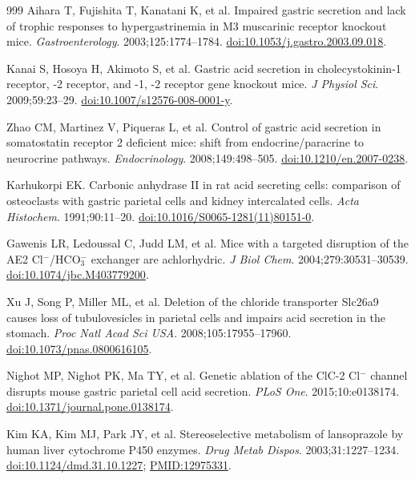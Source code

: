 \documentclass[11pt,a4paper,notitlepage]{report}
\begin{document}
\begin{thebibliography}{999}
 Aihara T, Fujishita T, Kanatani K, et al. Impaired gastric secretion and lack of trophic responses to hypergastrinemia in M3 muscarinic receptor knockout mice. \textit{Gastroenterology}. 2003;125:1774--1784. \href{https://doi.org/10.1053/j.gastro.2003.09.018}{doi:10.1053/j.gastro.2003.09.018}.

 Kanai S, Hosoya H, Akimoto S, et al. Gastric acid secretion in cholecystokinin-1 receptor, -2 receptor, and -1, -2 receptor gene knockout mice. \textit{J Physiol Sci}. 2009;59:23--29. \href{https://doi.org/10.1007/s12576-008-0001-y}{doi:10.1007/s12576-008-0001-y}.

 Zhao CM, Martinez V, Piqueras L, et al. Control of gastric acid secretion in somatostatin receptor 2 deficient mice: shift from endocrine/paracrine to neurocrine pathways. \textit{Endocrinology}. 2008;149:498--505. \href{https://doi.org/10.1210/en.2007-0238}{doi:10.1210/en.2007-0238}.

 Karhukorpi EK. Carbonic anhydrase II in rat acid secreting cells: comparison of osteoclasts with gastric parietal cells and kidney intercalated cells. \textit{Acta Histochem}. 1991;90:11--20. \href{https://doi.org/10.1016/S0065-1281(11)80151-0}{doi:10.1016/S0065-1281(11)80151-0}.

 Gawenis LR, Ledoussal C, Judd LM, et al. Mice with a targeted disruption of the AE2 Cl$^{-}$/HCO$_3^{-}$ exchanger are achlorhydric. \textit{J Biol Chem}. 2004;279:30531--30539. \href{https://doi.org/10.1074/jbc.M403779200}{doi:10.1074/jbc.M403779200}.

 Xu J, Song P, Miller ML, et al. Deletion of the chloride transporter Slc26a9 causes loss of tubulovesicles in parietal cells and impairs acid secretion in the stomach. \textit{Proc Natl Acad Sci USA}. 2008;105:17955--17960. \href{https://doi.org/10.1073/pnas.0800616105}{doi:10.1073/pnas.0800616105}.

 Nighot MP, Nighot PK, Ma TY, et al. Genetic ablation of the ClC-2 Cl$^{-}$ channel disrupts mouse gastric parietal cell acid secretion. \textit{PLoS One}. 2015;10:e0138174. \href{https://doi.org/10.1371/journal.pone.0138174}{doi:10.1371/journal.pone.0138174}.

 Kim KA, Kim MJ, Park JY, et al. Stereoselective metabolism of lansoprazole by human liver cytochrome P450 enzymes. \textit{Drug Metab Dispos}. 2003;31:1227--1234. \href{https://doi.org/10.1124/dmd.31.10.1227}{doi:10.1124/dmd.31.10.1227}; \href{https://pubmed.ncbi.nlm.nih.gov/12975331/}{PMID:12975331}.


\end{thebibliography}
\end{document}
